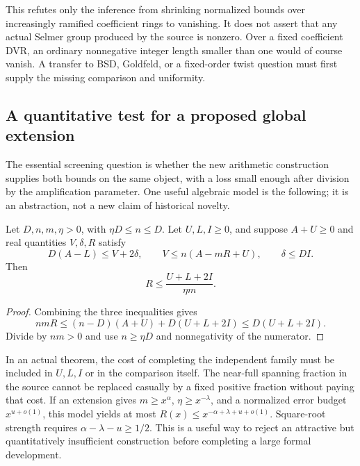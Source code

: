 This refutes only the inference from shrinking normalized bounds over increasingly ramified coefficient rings to vanishing. It does not assert that any actual Selmer group produced by the source is nonzero. Over a fixed coefficient DVR, an ordinary nonnegative integer length smaller than one would of course vanish. A transfer to BSD, Goldfeld, or a fixed-order twist question must first supply the missing comparison and uniformity.

\subsection{A quantitative test for a proposed global extension}

The essential screening question is whether the new arithmetic construction supplies both bounds on the same object, with a loss small enough after division by the amplification parameter. One useful algebraic model is the following; it is an abstraction, not a new claim of historical novelty.

\begin{proposition}\label{prop:budget}
Let $D,n,m,\eta>0$, with $\eta D\le n\le D$. Let $U,L,I\ge0$, and suppose $A+U\ge0$ and real quantities $V,\delta,R$ satisfy
\[
 D(A-L)\le V+2\delta,\qquad
 V\le n(A-mR+U),\qquad \delta\le DI.
\]
Then
\[
 R\le\frac{U+L+2I}{\eta m}.
\]
\end{proposition}
\begin{proof}
Combining the three inequalities gives
\[
 nmR\le(n-D)(A+U)+D(U+L+2I)
 \le D(U+L+2I).
\]
Divide by $nm>0$ and use $n\ge\eta D$ and nonnegativity of the numerator.
\end{proof}

In an actual theorem, the cost of completing the independent family must be included in $U,L,I$ or in the comparison itself. The near-full spanning fraction in the source cannot be replaced casually by a fixed positive fraction without paying that cost. If an extension gives $m\ge x^\alpha$, $\eta\ge x^{-\lambda}$, and a normalized error budget $x^{u+o(1)}$, this model yields at most
$R(x)\le x^{-\alpha+\lambda+u+o(1)}$. Square-root strength requires $\alpha-\lambda-u\ge1/2$. This is a useful way to reject an attractive but quantitatively insufficient construction before completing a large formal development.

